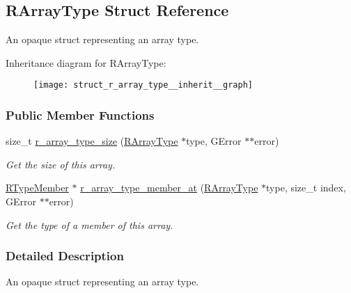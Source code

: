 \hypertarget{struct_r_array_type}{\subsection{R\-Array\-Type Struct Reference}
\label{struct_r_array_type}
}


An opaque struct representing an array type.  




Inheritance diagram for R\-Array\-Type\-:\nopagebreak
\begin{figure}[H]
\begin{center}
\leavevmode
\texttt{[image: struct\_r\_array\_type\_\_inherit\_\_graph]}
\end{center}
\end{figure}
\subsubsection*{Public Member Functions}
\begin{DoxyCompactItemize}
\item 
size\-\_\-t \hyperlink{struct_r_array_type_a91fdc9370c7373eae37b12372042a9d6}{r\-\_\-array\-\_\-type\-\_\-size} (\hyperlink{struct_r_array_type}{R\-Array\-Type} $\ast$type, G\-Error $\ast$$\ast$error)
\begin{DoxyCompactList}\small\item\em Get the size of this array. \end{DoxyCompactList}\item 
\hyperlink{struct_r_type_member}{R\-Type\-Member} $\ast$ \hyperlink{struct_r_array_type_a7efce78c90306eca927204d10b72f4e4}{r\-\_\-array\-\_\-type\-\_\-member\-\_\-at} (\hyperlink{struct_r_array_type}{R\-Array\-Type} $\ast$type, size\-\_\-t index, G\-Error $\ast$$\ast$error)
\begin{DoxyCompactList}\small\item\em Get the type of a member of this array. \end{DoxyCompactList}\end{DoxyCompactItemize}


\subsubsection{Detailed Description}
An opaque struct representing an array type. 

